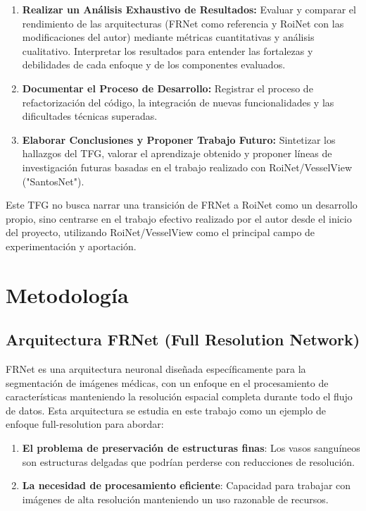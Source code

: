 \documentclass[11pt,a4paper]{report} %
\begin{document}
\begin{enumerate}
\begin{itemize}
        \item Experimentación con variaciones arquitectónicas dentro de RoiNet.
        \item Inicio del desarrollo y prueba de una nueva función de pérdida adaptada a los objetivos del proyecto. \texttt{[PENDIENTE: Detallar si esta función de pérdida se concretó]}
    \end{itemize}
  \item \textbf{Realizar un Análisis Exhaustivo de Resultados:} Evaluar y comparar el rendimiento de las arquitecturas (FRNet como referencia y RoiNet con las modificaciones del autor) mediante métricas cuantitativas y análisis cualitativo. Interpretar los resultados para entender las fortalezas y debilidades de cada enfoque y de los componentes evaluados.
  \item \textbf{Documentar el Proceso de Desarrollo:} Registrar el proceso de refactorización del código, la integración de nuevas funcionalidades y las dificultades técnicas superadas.
  \item \textbf{Elaborar Conclusiones y Proponer Trabajo Futuro:} Sintetizar los hallazgos del TFG, valorar el aprendizaje obtenido y proponer líneas de investigación futuras basadas en el trabajo realizado con RoiNet/VesselView ("SantosNet").
\end{enumerate}
Este TFG no busca narrar una transición de FRNet a RoiNet como un desarrollo propio, sino centrarse en el trabajo efectivo realizado por el autor desde el inicio del proyecto, utilizando RoiNet/VesselView como el principal campo de experimentación y aportación.

\chapter{Metodología}
\section{Arquitectura FRNet (Full Resolution Network)}
FRNet es una arquitectura neuronal diseñada específicamente para la segmentación de imágenes médicas, con un enfoque en el procesamiento de características manteniendo la resolución espacial completa durante todo el flujo de datos. Esta arquitectura se estudia en este trabajo como un ejemplo de enfoque full-resolution para abordar:
\begin{enumerate}
  \item \textbf{El problema de preservación de estructuras finas}: Los vasos sanguíneos son estructuras delgadas que podrían perderse con reducciones de resolución.
  \item \textbf{La necesidad de procesamiento eficiente}: Capacidad para trabajar con imágenes de alta resolución manteniendo un uso razonable de recursos.
\end{enumerate}
\end{document}

